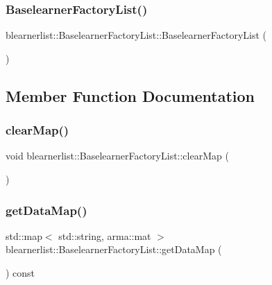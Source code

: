 \subsubsection{\texorpdfstring{Baselearner\+Factory\+List()}{BaselearnerFactoryList()}}
{\footnotesize\ttfamily blearnerlist\+::\+Baselearner\+Factory\+List\+::\+Baselearner\+Factory\+List (\begin{DoxyParamCaption}{ }\end{DoxyParamCaption})}



\subsection{Member Function Documentation}
\mbox{\label{classblearnerlist_1_1_baselearner_factory_list_aacbe97968ca672d2481d5f8dce0bbf94}} 
\subsubsection{\texorpdfstring{clear\+Map()}{clearMap()}}
{\footnotesize\ttfamily void blearnerlist\+::\+Baselearner\+Factory\+List\+::clear\+Map (\begin{DoxyParamCaption}{ }\end{DoxyParamCaption})}

\mbox{\label{classblearnerlist_1_1_baselearner_factory_list_aeb83b67769e5fb34e7acc14c7e651dfc}} 
\subsubsection{\texorpdfstring{get\+Data\+Map()}{getDataMap()}}
{\footnotesize\ttfamily std\+::map$<$ std\+::string, arma\+::mat $>$ blearnerlist\+::\+Baselearner\+Factory\+List\+::get\+Data\+Map (\begin{DoxyParamCaption}{ }\end{DoxyParamCaption}) const}

